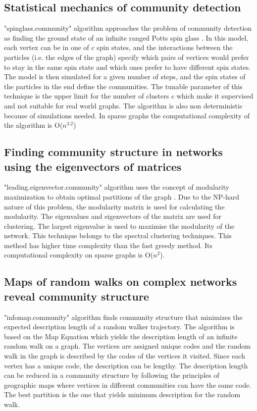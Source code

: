 \subsection{Statistical mechanics of community detection}
"spinglass.community" algorithm approaches the problem of community detection as finding the ground state of an infinite ranged Potts spin glass \cite{aps:36}. In this model, each vertex can be in one of $c$ spin states, and the interactions between the particles (i.e. the edges of the graph) specify which pairs of vertices would prefer to stay in the same spin state and which ones prefer to have different spin states. The model is then simulated for a given number of steps, and the spin states of the particles in the end define the communities. The tunable parameter of this technique is the upper limit for the number of clusters $c$ which make it supervised and not suitable for real world graphs. The algorithm is also non deterministic because of simulations needed. In sparse graphs the computational complexity of the algorithm is O($n^{3.2}$)

\subsection{Finding community structure in networks using the eigenvectors of matrices}
"leading.eigenvector.community" algorithm uses the concept of modularity maximization to obtain optimal partitions of the graph \cite{aps:36}. Due to the NP-hard nature of this problem, the modularity matrix is used for calculating the modularity. The eigenvalues and eigenvectors of the matrix are used for clustering. The largest eigenvalue is used to maximise the modularity of the network. This technique belongs to the spectral clustering techniques. This method has higher time complexity than the fast greedy method. Its computational complexity on sparse graphs is O($n^2$).

\subsection{Maps of random walks on complex networks reveal community structure}
"infomap.community" algorithm finds community structure that minimizes the expected description length of a random walker trajectory\cite{aps:36}. The algorithm is based on the Map Equation which yields the description length of an infinite random walk on a graph. The vertices are assigned unique codes and the random walk in the graph is described by the codes of the vertices it visited. Since each vertex has a unique code, the description can be lengthy. The description length can be reduced in a community structure by following the principles of geographic maps where vertices in different communities can have the same code. The best partition is the one that yields minimum description for the random walk.\\

